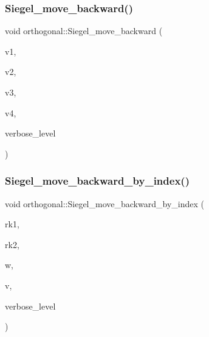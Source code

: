 \mbox{\label{classorthogonal_a365beaf002d1ffc9a600e73f1983e800}} 
\subsubsection{\texorpdfstring{Siegel\+\_\+move\+\_\+backward()}{Siegel\_move\_backward()}}
{\footnotesize\ttfamily void orthogonal\+::\+Siegel\+\_\+move\+\_\+backward (\begin{DoxyParamCaption}\item[{\mbox{\hyperlink{galois_8h_a09fddde158a3a20bd2dcadb609de11dc}{I\+NT}} $\ast$}]{v1,  }\item[{\mbox{\hyperlink{galois_8h_a09fddde158a3a20bd2dcadb609de11dc}{I\+NT}} $\ast$}]{v2,  }\item[{\mbox{\hyperlink{galois_8h_a09fddde158a3a20bd2dcadb609de11dc}{I\+NT}} $\ast$}]{v3,  }\item[{\mbox{\hyperlink{galois_8h_a09fddde158a3a20bd2dcadb609de11dc}{I\+NT}} $\ast$}]{v4,  }\item[{\mbox{\hyperlink{galois_8h_a09fddde158a3a20bd2dcadb609de11dc}{I\+NT}}}]{verbose\+\_\+level }\end{DoxyParamCaption})}

\mbox{\label{classorthogonal_aa8eaeba82de3ff3b5f50b4ccd22b2631}} 
\subsubsection{\texorpdfstring{Siegel\+\_\+move\+\_\+backward\+\_\+by\+\_\+index()}{Siegel\_move\_backward\_by\_index()}}
{\footnotesize\ttfamily void orthogonal\+::\+Siegel\+\_\+move\+\_\+backward\+\_\+by\+\_\+index (\begin{DoxyParamCaption}\item[{\mbox{\hyperlink{galois_8h_a09fddde158a3a20bd2dcadb609de11dc}{I\+NT}}}]{rk1,  }\item[{\mbox{\hyperlink{galois_8h_a09fddde158a3a20bd2dcadb609de11dc}{I\+NT}}}]{rk2,  }\item[{\mbox{\hyperlink{galois_8h_a09fddde158a3a20bd2dcadb609de11dc}{I\+NT}} $\ast$}]{w,  }\item[{\mbox{\hyperlink{galois_8h_a09fddde158a3a20bd2dcadb609de11dc}{I\+NT}} $\ast$}]{v,  }\item[{\mbox{\hyperlink{galois_8h_a09fddde158a3a20bd2dcadb609de11dc}{I\+NT}}}]{verbose\+\_\+level }\end{DoxyParamCaption})}

